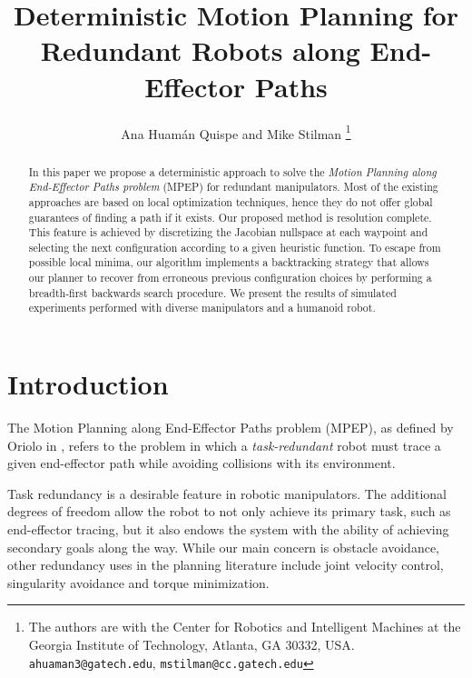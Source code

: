 \documentclass[conference]{IEEEtran}
\begin{document}
\title{{D}eterministic {M}otion {P}lanning for {R}edundant {R}obots along {E}nd-{E}ffector {P}aths}
\author{Ana Huam\'an Quispe and Mike Stilman%
  \thanks{The authors are with the Center for Robotics and Intelligent
    Machines at the Georgia Institute of Technology, Atlanta, GA
    30332, USA. {\tt\small ahuaman3@gatech.edu}, {\tt\small mstilman@cc.gatech.edu}}}
\maketitle

\begin{abstract}
In this paper we propose a deterministic approach to solve the \emph{Motion Planning
along End-Effector Paths problem} (MPEP) for redundant manipulators. Most of the existing
approaches are based on local optimization techniques, hence they do not
offer global guarantees of finding a path if it exists. Our proposed method is resolution complete.
This feature is achieved by discretizing the Jacobian nullspace at each waypoint and selecting the 
next configuration according to a given heuristic function. To escape from possible local minima, our
algorithm implements a backtracking strategy that allows our planner to recover from erroneous
previous configuration choices by performing a breadth-first backwards search procedure. We present the 
results of simulated experiments performed with diverse manipulators and a humanoid robot.  

\end{abstract}

\section{Introduction}
The {Motion Planning along End-Effector Paths problem} (MPEP), as defined by Oriolo in \cite{oriolo-ns-2002},
refers to the problem in which a \emph{task-redundant} robot must trace a given end-effector path while avoiding
collisions with its environment. 
 
Task redundancy is a desirable feature in robotic manipulators. The 
additional degrees of freedom allow the robot to not only achieve
its primary task, such as end-effector tracing, but 
it also endows the system with the ability of achieving secondary goals along the way. 
While our main concern is obstacle avoidance, other redundancy
uses in the planning literature include joint velocity control,
singularity avoidance and torque minimization.
\end{document}
